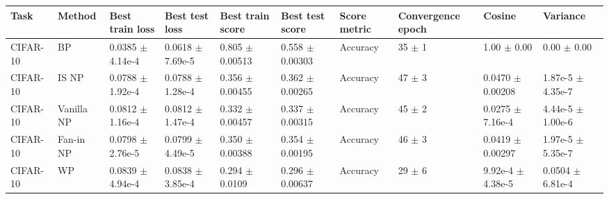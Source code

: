 \begin{tabular}{llllllllll}
\toprule
Task & Method & Best train loss & Best test loss & Best train score & Best test score & Score metric & Convergence epoch & Cosine & Variance \\
\midrule
CIFAR-10 & BP & 0.0385 $\pm$ 4.14e-4 & 0.0618 $\pm$ 7.69e-5 & 0.805 $\pm$ 0.00513 & 0.558 $\pm$ 0.00303 & Accuracy & 35 $\pm$ 1 & 1.00 $\pm$ 0.00 & 0.00 $\pm$ 0.00 \\
CIFAR-10 & IS NP & 0.0788 $\pm$ 1.92e-4 & 0.0788 $\pm$ 1.28e-4 & 0.356 $\pm$ 0.00455 & 0.362 $\pm$ 0.00265 & Accuracy & 47 $\pm$ 3 & 0.0470 $\pm$ 0.00208 & 1.87e-5 $\pm$ 4.35e-7 \\
CIFAR-10 & Vanilla NP & 0.0812 $\pm$ 1.16e-4 & 0.0812 $\pm$ 1.47e-4 & 0.332 $\pm$ 0.00457 & 0.337 $\pm$ 0.00315 & Accuracy & 45 $\pm$ 2 & 0.0275 $\pm$ 7.16e-4 & 4.44e-5 $\pm$ 1.00e-6 \\
CIFAR-10 & Fan-in NP & 0.0798 $\pm$ 2.76e-5 & 0.0799 $\pm$ 4.49e-5 & 0.350 $\pm$ 0.00388 & 0.354 $\pm$ 0.00195 & Accuracy & 46 $\pm$ 3 & 0.0419 $\pm$ 0.00297 & 1.97e-5 $\pm$ 5.35e-7 \\
CIFAR-10 & WP & 0.0839 $\pm$ 4.94e-4 & 0.0838 $\pm$ 3.85e-4 & 0.294 $\pm$ 0.0109 & 0.296 $\pm$ 0.00637 & Accuracy & 29 $\pm$ 6 & 9.92e-4 $\pm$ 4.38e-5 & 0.0504 $\pm$ 6.81e-4 \\
\bottomrule
\end{tabular}
